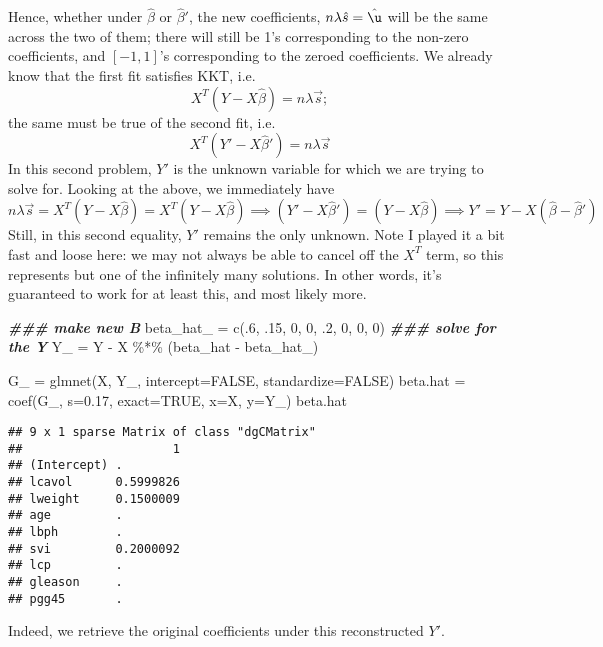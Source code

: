 \documentclass[
]{article}
\newenvironment{Shaded}{\begin{snugshade}}{\end{snugshade}}
\newcommand{\AttributeTok}[1]{\textcolor[rgb]{0.77,0.63,0.00}{#1}}
\newcommand{\ConstantTok}[1]{\textcolor[rgb]{0.00,0.00,0.00}{#1}}
\newcommand{\DecValTok}[1]{\textcolor[rgb]{0.00,0.00,0.81}{#1}}
\newcommand{\DocumentationTok}[1]{\textcolor[rgb]{0.56,0.35,0.01}{\textbf{\textit{#1}}}}
\newcommand{\FloatTok}[1]{\textcolor[rgb]{0.00,0.00,0.81}{#1}}
\newcommand{\FunctionTok}[1]{\textcolor[rgb]{0.00,0.00,0.00}{#1}}
\newcommand{\NormalTok}[1]{#1}
\newcommand{\OtherTok}[1]{\textcolor[rgb]{0.56,0.35,0.01}{#1}}
\newcommand{\SpecialCharTok}[1]{\textcolor[rgb]{0.00,0.00,0.00}{#1}}
\begin{document}
Hence, whether under \(\hat \beta\) or \(\hat\beta'\), the new
coefficients, \(n\lambda\hat s = \hat \u\) will be the same across the
two of them; there will still be 1's corresponding to the non-zero
coefficients, and \([-1, 1]\)'s corresponding to the zeroed
coefficients. We already know that the first fit satisfies KKT, i.e. \[
X^T(Y - X\hat\beta) = n\lambda \vec s;
\] the same must be true of the second fit, i.e. \[
X^T(Y' - X\hat\beta') = n\lambda \vec s
\] In this second problem, \(Y'\) is the unknown variable for which we
are trying to solve for. Looking at the above, we immediately have \[
n\lambda \vec s = X^T(Y - X\hat\beta) = X^T(Y - X\hat\beta)
\implies 
(Y' - X\hat\beta') = (Y - X\hat\beta)
\implies 
Y' = Y - X(\hat\beta - \hat \beta')
\] Still, in this second equality, \(Y'\) remains the only unknown. Note
I played it a bit fast and loose here: we may not always be able to
cancel off the \(X^T\) term, so this represents but one of the
infinitely many solutions. In other words, it's guaranteed to work for
at least this, and most likely more.

\begin{Shaded}
\begin{Highlighting}[]
\DocumentationTok{\#\#\# make new B\textquotesingle{}}
\NormalTok{beta\_hat\_ }\OtherTok{=} \FunctionTok{c}\NormalTok{(.}\DecValTok{6}\NormalTok{, .}\DecValTok{15}\NormalTok{, }\DecValTok{0}\NormalTok{, }\DecValTok{0}\NormalTok{, .}\DecValTok{2}\NormalTok{, }\DecValTok{0}\NormalTok{, }\DecValTok{0}\NormalTok{, }\DecValTok{0}\NormalTok{)}
\DocumentationTok{\#\#\# solve for the Y}
\NormalTok{Y\_ }\OtherTok{=}\NormalTok{ Y }\SpecialCharTok{{-}}\NormalTok{ X }\SpecialCharTok{\%*\%}\NormalTok{ (beta\_hat }\SpecialCharTok{{-}}\NormalTok{ beta\_hat\_)}

\NormalTok{G\_ }\OtherTok{=} \FunctionTok{glmnet}\NormalTok{(X, Y\_, }\AttributeTok{intercept=}\ConstantTok{FALSE}\NormalTok{, }\AttributeTok{standardize=}\ConstantTok{FALSE}\NormalTok{)}
\NormalTok{beta.hat }\OtherTok{=}  \FunctionTok{coef}\NormalTok{(G\_, }\AttributeTok{s=}\FloatTok{0.17}\NormalTok{, }\AttributeTok{exact=}\ConstantTok{TRUE}\NormalTok{, }\AttributeTok{x=}\NormalTok{X, }\AttributeTok{y=}\NormalTok{Y\_)}
\NormalTok{beta.hat}
\end{Highlighting}
\end{Shaded}

\begin{verbatim}
## 9 x 1 sparse Matrix of class "dgCMatrix"
##                     1
## (Intercept) .        
## lcavol      0.5999826
## lweight     0.1500009
## age         .        
## lbph        .        
## svi         0.2000092
## lcp         .        
## gleason     .        
## pgg45       .
\end{verbatim}

Indeed, we retrieve the original coefficients under this reconstructed
\(Y'\).
\end{document}
